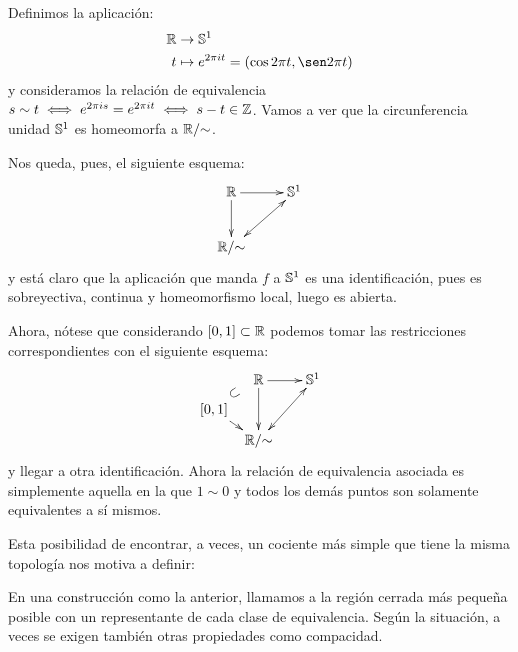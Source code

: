 \begin{exa}
	Definimos la aplicación:
	\[\begin{split}
	\R&\to\esfera^1 \\
	t&\mapsto e^{2\pi it}=(\cos 2\pi t,\sen 2\pi t)
	\end{split}\]
	y consideramos la relación de equivalencia $s\sim t\iff e^{2\pi is}=e^{2\pi it}\iff s-t\in\mathbb{Z}$. Vamos a ver que la circunferencia unidad $\mathbb{S}^1$ es homeomorfa a $\mathbb{R}/\mathord{\sim}$.
	
	Nos queda, pues, el siguiente esquema:
	\[\xymatrix{
		\R \ar[r] \ar[d] &
		\esfera^1 \\
		\R/\mathord{\sim}  \ar@{<->}[ru]
	}\]
	y está claro que la aplicación que manda $f$ a $\mathbb{S}^1$ es una identificación, pues es sobreyectiva, continua y homeomorfismo local, luego es abierta.
	
	Ahora, nótese que considerando $[0,1]\subset\mathbb{R}$ podemos tomar las restricciones correspondientes con el siguiente esquema:
	\[\xymatrix @C=0.5pc @R=0.5pc @L=-0.2pc {
		& \R \ar[rr] \ar[dd] & &
		\esfera^1 \\
		[0,1] \ar@{}[ur]^*[@]{\subset} \ar[dr] \\
		& \R/\mathord{\sim}  \ar@{<->}[rruu]
	}\]
	y llegar a otra identificación. Ahora la relación de equivalencia asociada es simplemente aquella en la que $1\sim 0$ y todos los demás puntos son solamente equivalentes a sí mismos.
\end{exa}

Esta posibilidad de encontrar, a veces, un cociente más simple que tiene la misma topología nos motiva a definir:

\begin{defi}
	En una construcción como la anterior, llamamos  a la región cerrada más pequeña posible con un representante de cada clase de equivalencia. Según la situación, a veces se exigen también otras propiedades como compacidad.
\end{defi}

